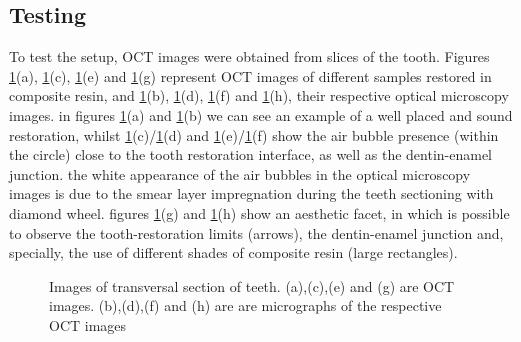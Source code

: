\documentclass[12pt,twoside,english]{book}
\renewcommand{\~}{\perispomeni}%
\numberwithin{equation}{section}
\numberwithin{figure}{section}
\begin{document}
\subsection{Testing}

To test the setup, OCT images were obtained from slices of the tooth. Figures \ref{fig:SROCT2 test}(a), \ref{fig:SROCT2 test}(c), \ref{fig:SROCT2 test}(e) and \ref{fig:SROCT2 test}(g) represent OCT images of different samples restored in composite resin, and \ref{fig:SROCT2 test}(b), \ref{fig:SROCT2 test}(d), \ref{fig:SROCT2 test}(f) and \ref{fig:SROCT2 test}(h), their respective optical microscopy images. in figures \ref{fig:SROCT2 test}(a) and \ref{fig:SROCT2 test}(b) we can see an example of a well placed and sound restoration, whilst \ref{fig:SROCT2 test}(c)/\ref{fig:SROCT2 test}(d) and \ref{fig:SROCT2 test}(e)/\ref{fig:SROCT2 test}(f) show the air bubble presence (within the circle) close to the tooth restoration interface, as well as the dentin-enamel junction. the white appearance of the air bubbles in the optical microscopy images is due to the smear layer impregnation during the teeth sectioning with diamond wheel. figures \ref{fig:SROCT2 test}(g) and \ref{fig:SROCT2 test}(h) show an aesthetic facet, in which is possible to observe the tooth-restoration limits (arrows), the dentin-enamel junction and, specially, the use of different shades of composite resin (large rectangles).

%
\begin{figure}[h]
\noindent \begin{centering}

\caption{Images of transversal section of teeth. (a),(c),(e) and (g) are OCT images. (b),(d),(f) and (h) are are micrographs of the respective OCT images}
\label{fig:SROCT2 test}
\par\end{centering}
\end{figure}
\end{document}

